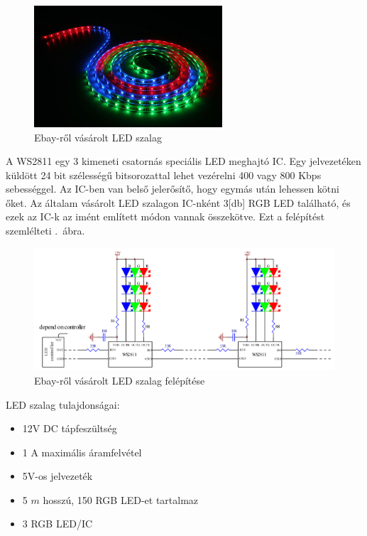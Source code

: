 \documentclass[../main.tex]{subfiles}
\begin{document}
            \begin{figure}[h!]
                \centering
                    \includegraphics[width=7cm]{resources/pcb_res/ledstrip}
                \caption{Ebay-ről vásárolt LED szalag}
                \label{fig:ledstrip}
            \end{figure}
        
            A WS2811 egy 3 kimeneti csatornás speciális LED meghajtó IC. Egy jelvezetéken küldött 24 bit szélességű bitsorozattal lehet vezérelni 400 vagy 800 Kbps sebességgel. Az IC-ben van belső jelerősítő, hogy egymás után lehessen kötni őket. Az általam vásárolt LED szalagon IC-nként 3[db] RGB LED található, és ezek az IC-k az imént említett módon vannak összekötve. Ezt a felépítést szemlélteti .~ábra.\\[12px]
            
            \begin{figure}[h!]
                \centering
                \includegraphics[width=14cm]{resources/pcb_res/ledstrip_schematic.png}
                \caption{Ebay-ről vásárolt LED szalag felépítése\cite{ds_ws2811}}
                \label{fig:ledstrip_schematic}
            \end{figure}
            
            LED szalag tulajdonságai:
            \begin{itemize}
                \item 12V DC tápfeszültség
                \item 1 A maximális áramfelvétel
                \item 5V-os jelvezeték
                \item 5 $m$ hosszú, 150 RGB LED-et tartalmaz
                \item 3 RGB LED/IC
            \end{itemize}
            
\end{document}
